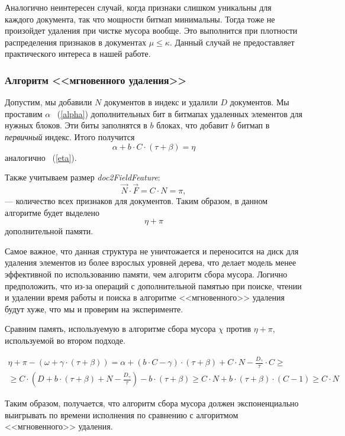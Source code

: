 Аналогично неинтересен случай, когда признаки слишком уникальны для каждого документа,
так что мощности битмап минимальны. Тогда тоже не произойдет удаления при чистке
мусора вообще. Это выполнится при плотности распределения признаков в документах
$\mu \leq \kappa$. Данный случай не предоставляет практического интереса в нашей работе.

\subsubsection{Алгоритм <<мгновенного удаления>>}

Допустим, мы добавили $N$ документов в индекс и удалили $D$ документов. Мы
проставим $\alpha$ ~(\ref{alpha}) дополнительных бит в битмапах удаленных элементов для нужных блоков.
Эти биты заполнятся в $b$ блоках, что добавит $b$ битмап в \textit{первичный}
индекс. Итого получится
\begin{equation}
    \alpha + b \cdot C \cdot (\tau + \beta) = \eta
\end{equation}
аналогично ~(\ref{eta}).

Также учитываем размер \textit{doc2FieldFeature}: 
\begin{equation}
    \vec{N} \cdot \vec{F} = C \cdot N= \pi,
\end{equation}
— количество всех признаков для документов. Таким образом, в данном алгоритме будет выделено 
\begin{equation}
    \eta + \pi
\end{equation}
дополнительной памяти.

Самое важное, что данная структура не уничтожается и переносится на диск для
удаления элементов из более взрослых уровней дерева, что делает модель менее эффективной по
использованию памяти, чем алгоритм сбора мусора. Логично предположить, что из-за
операций с дополнительной памятью при поиске, чтении и удалении время работы и
поиска в алгоритме <<мгновенного>> удаления будут хуже, что мы и проверим на эксперименте.

Сравним память, используемую в алгоритме сбора мусора $\chi$ против $\eta + \pi$,
используемой во втором подходе.

\begin{multline}
    \eta + \pi - \left(\omega + \gamma \cdot \left(\tau + \beta\right)\right) =
    \alpha + \left(b \cdot C - \gamma\right) \cdot (\tau + \beta) + C \cdot N - \frac{D_{\gamma}}{\tau} \cdot C \geq \\
    \geq C \cdot \left(D + b \cdot (\tau + \beta) + N - \frac{D_{\gamma}}{\tau}\right) - b \cdot \left(\tau + \beta\right) \geq
    C \cdot N + b \cdot \left(\tau + \beta\right) \cdot (C - 1) \geq C \cdot N
\end{multline}

Таким образом, получается, что алгоритм сбора мусора должен экспоненциально
выигрывать по времени исполнения по сравнению с алгоритмом <<мгновенного>> удаления.